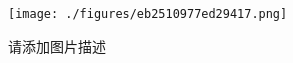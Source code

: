 
\begin{figure}[ht]
\centering
\texttt{[image: ./figures/eb2510977ed29417.png]}
\caption{请添加图片描述} \label{fig_testIM_1}
\end{figure}